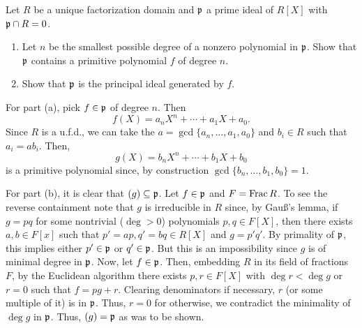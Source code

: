 \begin{problem}
  Let \(R\) be a unique factorization domain and \(\mathfrak{p}\) a prime ideal
  of \(R[X]\) with \(\mathfrak{p}\cap R=0\).
  \begin{enumerate}[label=(\alph*)]
  \item Let \(n\) be the smallest possible degree of a nonzero polynomial
    in \(\mathfrak{p}\). Show that \(\mathfrak{p}\) contains a primitive polynomial
    \(f\) of degree \(n\).
  \item Show that \(\mathfrak{p}\) is the principal ideal generated by \(f\).
  \end{enumerate}
\end{problem}
\begin{solution}
  For part (a), pick \(f\in\mathfrak{p}\) of degree \(n\). Then
  \[
    f(X)=a_nX^n+\dotsb+a_1X+a_0.
  \]
  Since \(R\) is a u.f.d.\@, we can take the
  \(a=\gcd\{a_n,\dotsc,a_1,a_0\}\) and \(b_i\in R\) such that
  \(a_i=ab_i\). Then,
  \[
    g(X)=b_nX^n+\dotsb+b_1X+b_0
  \]
  is a primitive polynomial since, by construction
  \(\gcd\{b_n,\dotsc,b_1,b_0\}=1\).

  For part (b), it is clear that \((g)\subseteq\mathfrak{p}\). Let \(f\in\mathfrak{p}\)
  and \(F=\operatorname{Frac} R\). To see the reverse containment note that \(g\) is
  irreducible in \(R\) since, by Gauß's lemma, if \(g=pq\) for some
  nontrivial (\(\deg>0\)) polynomials \(p,q\in F[X]\), then there exists
  \(a,b\in F[x]\) such that \(p'=ap,q'=bq\in R[X]\) and \(g=p'q'\). By
  primality of \(\mathfrak{p}\), this implies either \(p'\in\mathfrak{p}\) or
  \(q'\in\mathfrak{p}\). But this is an impossibility since \(g\) is of minimal
  degree in \(\mathfrak{p}\). Now, let \(f\in\mathfrak{p}\). Then, embedding \(R\) in
  its field of fractions \(F\), by the Euclidean algorithm there exists
  \(p,r\in F[X]\) with \(\deg r<\deg g\) or \(r=0\) such that
  \(f=pg+r\). Clearing denominators if necessary, \(r\) (or some multiple
  of it) is in \(\mathfrak{p}\). Thus, \(r=0\) for otherwise, we contradict the
  minimality of \(\deg g\) in \(\mathfrak{p}\). Thus, \((g)=\mathfrak{p}\) as was to be
  shown.
\end{solution}

